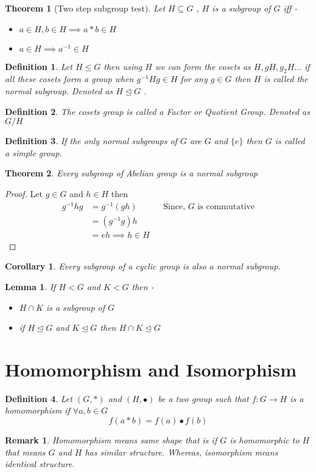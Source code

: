 \documentclass[12pt,a4paper]{article}
\newtheorem{thm}{Theorem}
\newtheorem*{defn}{Definition}
\newtheorem*{rem}{Remark}
\newtheorem*{lem}{Lemma}
\newtheorem*{cor}{Corollary}
\begin{document}
\begin{thm}[Two step subgroup test]
	Let $H \subseteq G$ , $H$ is a subgroup of $G$ iff -
	\begin{itemize}
		\item $a \in H, b\in H \implies a*b \in H$
		\item $a \in H \implies a^{-1} \in H$
	\end{itemize}
\end{thm}
\begin{defn} \normalfont
	Let $H \le G$ then using $H$ we can form the cosets as $H, gH, g_{2}H \dots$ if all these cosets form a group when $g^{-1}Hg \in H$ for any $g\in G$ then $H$ is called the normal subgroup. Denoted as $H \trianglelefteq G$ .
\end{defn}
\begin{defn} \normalfont
	The cosets group is called a Factor or Quotient Group. Denoted as $G/H$
\end{defn}
\begin{defn} \normalfont
	If the only normal subgroups of $G$ are $G$ and $\{e\}$ then $G$ is called a simple group.
\end{defn}

\begin{thm}
	Every subgroup of Abelian group is a normal subgroup
\end{thm}
\begin{proof}
	Let $g\in G$ and $h \in H$ then
	\begin{align*}
		g^{-1}hg &= g^{-1}(gh)		&& \text{Since, $G$ is commutative} \\
			     &= (g^{-1}g)h \\
			     &= eh \implies h \in H
	\end{align*}
\end{proof}
\begin{cor}
\normalfont	Every subgroup of a cyclic group is also a normal subgroup.
\end{cor}
\begin{lem}\normalfont
	If $H < G$ and $K < G$ then -
	\begin{itemize}
	\item $H \cap K$ is a subgroup of $G$
	\item if $H \trianglelefteq G$ and  $K \trianglelefteq G$ then $H \cap K \trianglelefteq G$
	\end{itemize}
\end{lem}

\section{Homomorphism and Isomorphism}
\begin{defn} \normalfont
	Let $(G,*)$ and $(H,\bullet)$ be a two group such that $f: G \to H$ is a homomorphism if $\forall a,b \in G$ 
	$$
		f(a*b) = f(a) \bullet f(b)
	$$
\end{defn}
\begin{rem}
	Homomorphism means same shape that is if $G$ is homomorphic to $H$ that means $G$ and $H$ has similar structure. Whereas, isomorphism means identical structure.
\end{rem}
\end{document}
